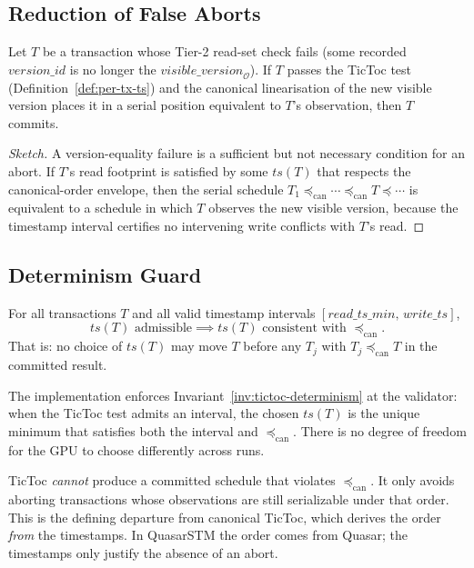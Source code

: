 \subsection{Reduction of False Aborts}

\begin{lemma}
\label{lem:tictoc-relax}
Let $T$ be a transaction whose Tier-2 read-set check fails (some
recorded $\mathit{version\_id}$ is no longer the
$\mathit{visible\_version}_\mathcal{O}$). If $T$ passes the TicToc
test (Definition~\ref{def:per-tx-ts}) and the canonical
linearisation of the new visible version places it in a serial
position equivalent to $T$'s observation, then $T$ commits.
\end{lemma}

\begin{proof}[Sketch]
A version-equality failure is a sufficient but not necessary
condition for an abort. If $T$'s read footprint is satisfied by some
$\mathit{ts}(T)$ that respects the canonical-order envelope, then the
serial schedule
$T_1 \preceq_{\mathrm{can}} \cdots \preceq_{\mathrm{can}} T \preceq
\cdots$ is equivalent to a schedule in which $T$ observes the new
visible version, because the timestamp interval certifies no
intervening write conflicts with $T$'s read.
\end{proof}

\subsection{Determinism Guard}

\begin{invariant}
\label{inv:tictoc-determinism}
For all transactions $T$ and all valid timestamp intervals
$[\mathit{read\_ts\_min},\, \mathit{write\_ts}]$,
\[
\mathit{ts}(T) \text{ admissible} \implies
\mathit{ts}(T) \text{ consistent with } \preceq_{\mathrm{can}}.
\]
That is: no choice of $\mathit{ts}(T)$ may move $T$ before any
$T_j$ with $T_j \preceq_{\mathrm{can}} T$ in the committed result.
\end{invariant}

The implementation enforces Invariant~\ref{inv:tictoc-determinism}
at the validator: when the TicToc test admits an interval, the
chosen $\mathit{ts}(T)$ is the unique minimum that satisfies both
the interval and $\preceq_{\mathrm{can}}$. There is no degree of
freedom for the GPU to choose differently across runs.

\begin{remark}[No reordering]
\label{rem:tictoc-no-reorder}
TicToc \emph{cannot} produce a committed schedule that violates
$\preceq_{\mathrm{can}}$. It only avoids aborting transactions whose
observations are still serializable under that order. This is the
defining departure from canonical TicToc, which derives the order
\emph{from} the timestamps. In QuasarSTM the order comes from
Quasar; the timestamps only justify the absence of an abort.
\end{remark}

